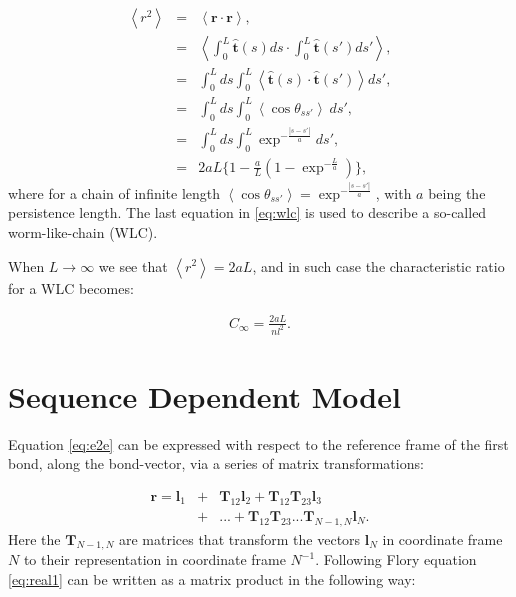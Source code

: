 \begin{eqnarray}
\label{eq:wlc}
\left<r^2\right> & = & \left<\textbf{r} \cdot \textbf{r}\right> \nonumber ,\\
               & = & \left<\int_{0}^{L}\hat{\textbf{t}}(s)ds \cdot \int_{0}^{L}\hat{\textbf{t}}(s')ds' \right>\nonumber ,\\
               & = & \int_{0}^{L} ds \int_{0}^{L} \left<\hat{\textbf{t}}(s) \cdot \hat{\textbf{t}}(s')\right>ds' \nonumber ,\\
               & = & \int_{0}^{L} ds \int_{0}^{L} \left<\cos{\theta}_{ss'}\right>~ ds' \nonumber ,\\
               & = & \int_{0}^{L} ds \int_{0}^{L} \exp^{-\frac{|s-s'|}{a}} ds' \nonumber ,\\
               & = & 2aL \{ 1 - \frac{a}{L}(1-\exp^{-\frac{L}{a}})\} ,
\end{eqnarray}
where for a  chain of infinite length $\left<\cos{\theta_{ss'}}\right>
=  \exp^{-\frac{|s-s'|}{a}}$, with $a$  being the  persistence length.
The  last equation  in \ref{eq:wlc}  is used  to describe  a so-called
worm-like-chain (WLC).

When $L \to \infty$ we see that $\left<r^{2}\right>=2aL$, and in such
case the characteristic ratio for a WLC becomes:

\begin{gather}
C_{\infty}=\frac{2aL}{nl^{2}} .
\end{gather}  

\section{Sequence Dependent Model}
Equation \ref{eq:e2e} can be expressed with respect to the reference
frame of the first bond, along  the bond-vector, via a series of matrix
transformations: 

\begin{eqnarray}
\label{eq:real1}  
\mathbf{r} = \mathbf{l}_{1} & + & \mathbf{T}_{12}\mathbf{l}_{2}
+\mathbf{T}_{12}\mathbf{T}_{23}\mathbf{l}_{3} \nonumber \\
 &  +   &  ...  +  \mathbf{T}_{12}\mathbf{T}_{23}...\mathbf{T}_{N-1,N}
\mathbf{l}_{N} .
\end{eqnarray}
Here the $\mathbf{T}_{N-1,N}$ are  matrices that transform the vectors
$\mathbf{l}_{N}$ in  coordinate frame  $N$ to their  representation in
coordinate frame $N^{-1}$.   Following Flory \cite{flory1969} equation
\ref{eq:real1} can  be written  as a matrix  product in  the following
way:

